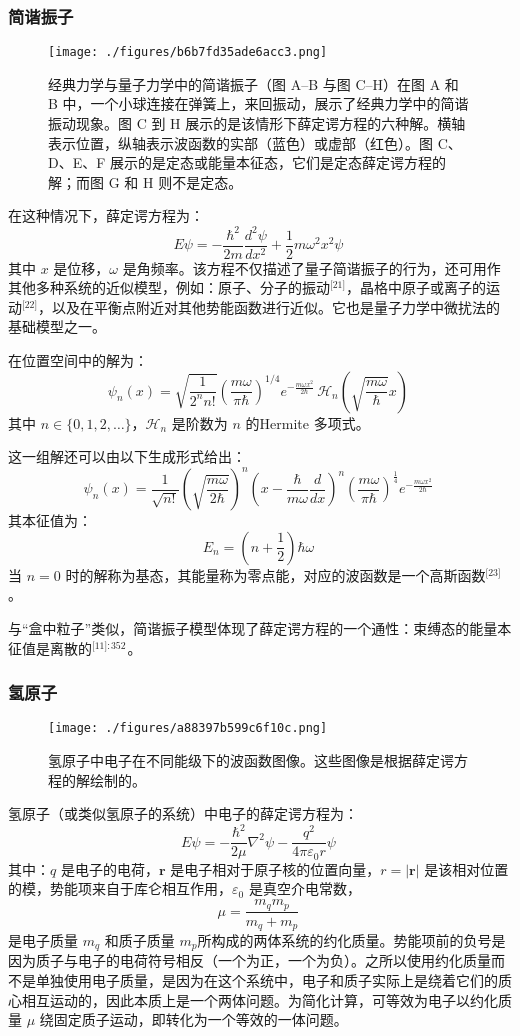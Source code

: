 \subsubsection{简谐振子}
\begin{figure}[ht]
\centering
\texttt{[image: ./figures/b6b7fd35ade6acc3.png]}
\caption{经典力学与量子力学中的简谐振子（图 A–B 与图 C–H）在图 A 和 B 中，一个小球连接在弹簧上，来回振动，展示了经典力学中的简谐振动现象。图 C 到 H 展示的是该情形下薛定谔方程的六种解。横轴表示位置，纵轴表示波函数的实部（蓝色）或虚部（红色）。图 C、D、E、F 展示的是定态或能量本征态，它们是定态薛定谔方程的解；而图 G 和 H 则不是定态。} \label{fig_XDEfc_4}
\end{figure}
在这种情况下，薛定谔方程为：
$$
E\psi = -\frac{\hbar^2}{2m} \frac{d^2\psi}{dx^2} + \frac{1}{2} m \omega^2 x^2 \psi~
$$
其中 $x$ 是位移，$\omega$ 是角频率。该方程不仅描述了量子简谐振子的行为，还可用作其他多种系统的近似模型，例如：原子、分子的振动\(^\text{[21]}\)，晶格中原子或离子的运动\(^\text{[22]}\)，以及在平衡点附近对其他势能函数进行近似。它也是量子力学中微扰法的基础模型之一。

在位置空间中的解为：
$$
\psi_n(x) = \sqrt{\frac{1}{2^n n!}} \left( \frac{m\omega}{\pi \hbar} \right)^{1/4} e^{- \frac{m\omega x^2}{2\hbar}} \, \mathcal{H}_n \left( \sqrt{\frac{m\omega}{\hbar}} x \right)~
$$
其中 $n \in \{0, 1, 2, \ldots\}$，$\mathcal{H}_n$ 是阶数为 $n$ 的Hermite 多项式。

这一组解还可以由以下生成形式给出：
$$
\psi_n(x) = \frac{1}{\sqrt{n!}} \left( \sqrt{ \frac{m\omega}{2\hbar} } \right)^n \left( x - \frac{\hbar}{m\omega} \frac{d}{dx} \right)^n \left( \frac{m\omega}{\pi\hbar} \right)^{\frac{1}{4}} e^{- \frac{m\omega x^2}{2\hbar}}~
$$
其本征值为：
$$
E_n = \left(n + \frac{1}{2} \right) \hbar \omega~
$$
当 $n = 0$ 时的解称为基态，其能量称为零点能，对应的波函数是一个高斯函数\(^\text{[23]}\)。

与“盒中粒子”类似，简谐振子模型体现了薛定谔方程的一个通性：束缚态的能量本征值是离散的\(^\text{[11]: 352 }\)。
\subsubsection{氢原子}
\begin{figure}[ht]
\centering
\texttt{[image: ./figures/a88397b599c6f10c.png]}
\caption{氢原子中电子在不同能级下的波函数图像。这些图像是根据薛定谔方程的解绘制的。} \label{fig_XDEfc_5}
\end{figure}
氢原子（或类似氢原子的系统）中电子的薛定谔方程为：
$$
E \psi = -\frac{\hbar^2}{2\mu} \nabla^2 \psi - \frac{q^2}{4\pi \varepsilon_0 r} \psi~
$$
其中：$q$ 是电子的电荷，$\mathbf{r}$ 是电子相对于原子核的位置向量，$r = |\mathbf{r}|$ 是该相对位置的模，势能项来自于库仑相互作用，$\varepsilon_0$ 是真空介电常数，
$$
\mu = \frac{m_q m_p}{m_q + m_p}~
$$
是电子质量 $m_q$ 和质子质量 $m_p$所构成的两体系统的约化质量。势能项前的负号是因为质子与电子的电荷符号相反（一个为正，一个为负）。之所以使用约化质量而不是单独使用电子质量，是因为在这个系统中，电子和质子实际上是绕着它们的质心相互运动的，因此本质上是一个两体问题。为简化计算，可等效为电子以约化质量 $\mu$ 绕固定质子运动，即转化为一个等效的一体问题。

